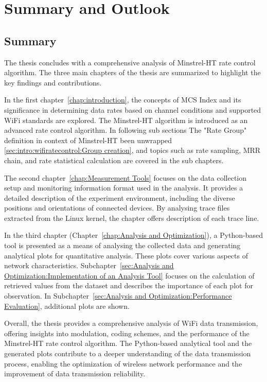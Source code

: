 \chapter{Summary and Outlook}
\label{chap:Summary and Outlook}

\section{Summary}

The thesis concludes with a comprehensive analysis of Minstrel-HT rate control algorithm. The three main chapters of the thesis are summarized to highlight the key findings and contributions.

In the first chapter~\ref{chap:introduction}, the concepts of MCS Index and its significance in determining data rates based on channel conditions and supported WiFi standards are explored. The Minstrel-HT algorithm is introduced as an advanced rate control algorithm. In following sub sections The "Rate Group" definition in context of Minstrel-HT been unwrapped \ref{sec:intro:wifiratecontrol:Group creation}, and topics such as rate sampling, MRR chain, and rate statistical calculation are covered in the sub chapters.

The second chapter~\ref{chap:Measurement Tools} focuses on the data collection setup and monitoring information format used in the analysis. It provides a detailed description of the experiment environment, including the diverse positions and orientations of connected devices. By analysing trace files~\cite{SNCX_internal_note} extracted from the Linux kernel, the chapter offers description of each trace line.

In the third chapter (Chapter~\ref{chap:Analysis and Optimization}), a Python-based tool is presented as a means of analysing the collected data and generating analytical plots for quantitative analysis. These plots cover various aspects of network characteristics. Subchapter~\ref{sec:Analysis and Optimization:Implementation of an Analysis Tool} focuses on the calculation of retrieved values from the dataset and describes the importance of each plot for observation. In Subchapter~\ref{sec:Analysis and Optimization:Performance Evaluation}, additional plots are shown.

Overall, the thesis provides a comprehensive analysis of WiFi data transmission, offering insights into modulation, coding schemes, and the performance of the Minstrel-HT rate control algorithm. The Python-based analytical tool and the generated plots contribute to a deeper understanding of the data transmission process, enabling the optimization of wireless network performance and the improvement of data transmission reliability.

